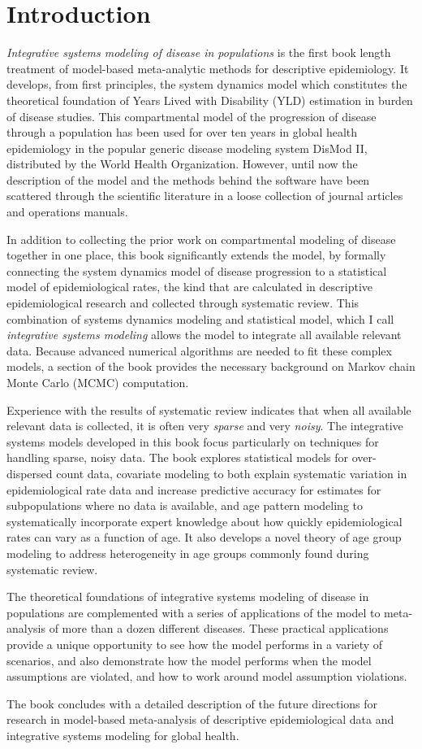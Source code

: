 \section{Introduction}
\emph{Integrative systems modeling of disease in populations} is the
first book length treatment of model-based meta-analytic methods for
descriptive epidemiology.  It develops, from first principles, the
system dynamics model which constitutes the theoretical foundation of
Years Lived with Disability (YLD) estimation in burden of disease
studies.  This compartmental model of the progression of disease
through a population has been used for over ten years in global health
epidemiology in the popular generic disease modeling system DisMod II,
distributed by the World Health Organization.  However, until now the
description of the model and the methods behind the software have been
scattered through the scientific literature in a loose collection of
journal articles and operations manuals.

In addition to collecting the prior work on compartmental modeling of
disease together in one place, this book significantly extends the
model, by formally connecting the system dynamics model of disease
progression to a statistical model of epidemiological rates, the kind
that are calculated in descriptive epidemiological research and
collected through systematic review.  This combination of systems
dynamics modeling and statistical model, which I call
\emph{integrative systems modeling} allows the model to integrate all
available relevant data.  Because advanced numerical algorithms are
needed to fit these complex models, a section of the book provides the
necessary background on Markov chain Monte Carlo (MCMC) computation.

Experience with the results of systematic review indicates that when
all available relevant data is collected, it is often very
\emph{sparse} and very \emph{noisy}.  The integrative systems models
developed in this book focus particularly on techniques for handling
sparse, noisy data.  The book explores statistical models for
over-dispersed count data, covariate modeling to both explain
systematic variation in epidemiological rate data and increase
predictive accuracy for estimates for subpopulations where no data is
available, and age pattern modeling to systematically incorporate
expert knowledge about how quickly epidemiological rates can vary as a
function of age.  It also develops a novel theory of age group
modeling to address heterogeneity in age groups commonly found during
systematic review.

The theoretical foundations of integrative systems modeling of disease
in populations are complemented with a series of applications of the
model to meta-analysis of more than a dozen different diseases.  These
practical applications provide a unique opportunity to see how the
model performs in a variety of scenarios, and also demonstrate how the
model performs when the model assumptions are violated, and how to
work around model assumption violations.

The book concludes with a detailed description of the future
directions for research in model-based meta-analysis of descriptive
epidemiological data and integrative systems modeling for global
health.
